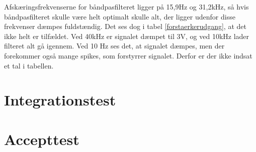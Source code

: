 Afskæringsfrekvenserne for båndpasfilteret ligger på 15,9Hz og 31,2kHz, så hvis båndpasfilteret skulle være helt optimalt skulle alt, der ligger udenfor disse frekvenser dæmpes fuldstændig. Det ses dog i tabel \ref{forstaerkerudgang}, at det ikke helt er tilfældet. Ved 40kHz er signalet dæmpet til 3V, og ved 10kHz lader filteret alt gå igennem. Ved 10 Hz ses det, at signalet dæmpes, men der forekommer også mange spikes, som forstyrrer signalet. Derfor er der ikke indsat et tal i tabellen. 

\section{Integrationstest}

\section{Accepttest}